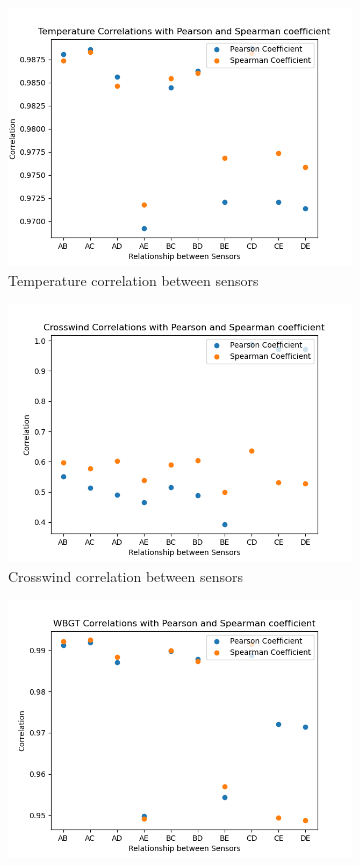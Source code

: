 \documentclass[a4paper,12pt]{article} %
\begin{document}
\begin{figure}[H] %
	\centering %
	\begin{subfigure}[b]{0.4\linewidth}
		\includegraphics[width=0.9\linewidth]{Figure_15.png} 
		\caption{Temperature correlation between sensors}
	\end{subfigure}
	\begin{subfigure}[b]{0.4\linewidth}
		\includegraphics[width=0.9\linewidth]{Figure_16.png} 
		\caption{Crosswind correlation between sensors}
	\end{subfigure}
	\begin{subfigure}[b]{0.4\linewidth}
		\includegraphics[width=0.9\linewidth]{Figure_17.png} 

\end{subfigure}
\end{figure}
\end{document}
